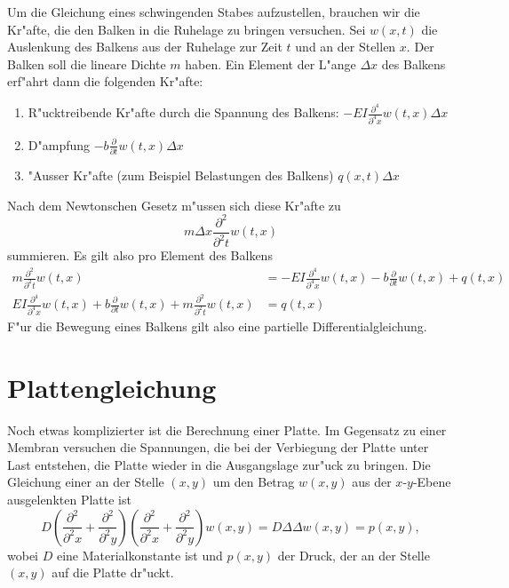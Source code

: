 Um die Gleichung eines schwingenden Stabes aufzustellen, brauchen wir
die Kr"afte, die den Balken in die Ruhelage zu bringen versuchen. Sei
$w(x,t)$ die Auslenkung des Balkens aus der Ruhelage zur Zeit $t$
und an der Stellen $x$. Der Balken soll die lineare Dichte $m$ haben.
Ein Element der L"ange $\Delta x$ des Balkens erf"ahrt dann die
folgenden Kr"afte:
\begin{enumerate}
\item R"ucktreibende Kr"afte durch die Spannung des Balkens: $-EI\frac{\partial^4}{\partial^4 x}w(t,x)\Delta x$
\item D"ampfung $-b\frac{\partial}{\partial t}w(t,x)\Delta x$
\item "Ausser Kr"afte (zum Beispiel Belastungen des Balkens) $q(x,t)\Delta x$
\end{enumerate}
Nach dem Newtonschen Gesetz m"ussen sich diese Kr"afte zu
\[
m\Delta x\frac{\partial^2}{\partial^2 t}w(t,x)
\]
summieren. Es gilt also pro Element des Balkens
\begin{align*}
m\frac{\partial^2}{\partial^2t}w(t,x)
&=-EI\frac{\partial^4}{\partial^4x}w(t,x)-b\frac{\partial}{\partial t}w(t,x)+q(t,x)
\\
EI\frac{\partial^4}{\partial^4x}w(t,x)
+b\frac{\partial}{\partial t}w(t,x)
+m\frac{\partial^2}{\partial^2t}w(t,x)
&=q(t,x)
\end{align*}
F"ur die Bewegung eines Balkens gilt also eine partielle Differentialgleichung.

\section{Plattengleichung}
Noch etwas komplizierter ist die Berechnung einer Platte. Im Gegensatz
zu einer Membran versuchen die Spannungen, die bei der Verbiegung der
Platte unter Last entstehen, die Platte wieder in die Ausgangslage zur"uck
zu bringen. Die Gleichung einer an der Stelle $(x,y)$ um den Betrag
$w(x,y)$ aus der $x$-$y$-Ebene ausgelenkten Platte ist
\[
D\left(
\frac{\partial^2}{\partial^2 x}
+
\frac{\partial^2}{\partial^2 y}
\right)
\left(
\frac{\partial^2}{\partial^2 x}
+
\frac{\partial^2}{\partial^2 y}
\right)
w(x,y)
=D\Delta\Delta w(x,y)
=p(x,y),
\]
wobei $D$ eine Materialkonstante ist und $p(x,y)$ der Druck, der
an der Stelle $(x,y)$ auf die Platte dr"uckt.


